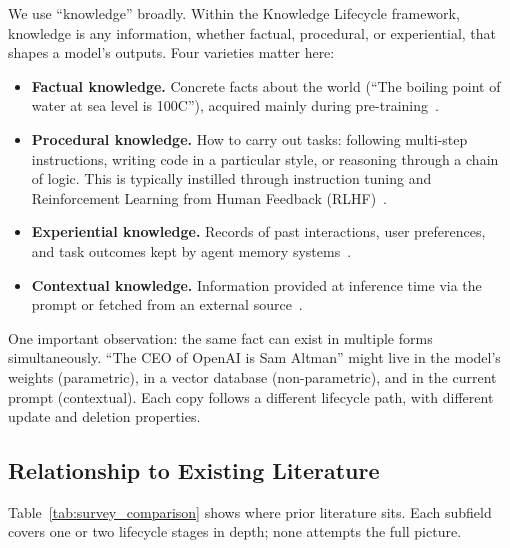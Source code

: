 \documentclass{article}
\begin{document}
We use ``knowledge'' broadly. Within the Knowledge Lifecycle framework, knowledge is any information, whether factual, procedural, or experiential, that shapes a model's outputs. Four varieties matter here:

\begin{itemize}[leftmargin=*]
  \item \textbf{Factual knowledge.} Concrete facts about the world (``The boiling point of water at sea level is 100\textdegree C''), acquired mainly during pre-training~\citep{petroni2019lama}.
  \item \textbf{Procedural knowledge.} How to carry out tasks: following multi-step instructions, writing code in a particular style, or reasoning through a chain of logic. This is typically instilled through instruction tuning and Reinforcement Learning from Human Feedback (RLHF)~\citep{ouyang2022instructgpt, wei2022flan}.
  \item \textbf{Experiential knowledge.} Records of past interactions, user preferences, and task outcomes kept by agent memory systems~\citep{park2023generative, packer2023memgpt}.
  \item \textbf{Contextual knowledge.} Information provided at inference time via the prompt or fetched from an external source~\citep{lewis2020rag}.
\end{itemize}

One important observation: the same fact can exist in multiple forms simultaneously. ``The CEO of OpenAI is Sam Altman'' might live in the model's weights (parametric), in a vector database (non-parametric), and in the current prompt (contextual). Each copy follows a different lifecycle path, with different update and deletion properties.

\subsection{Relationship to Existing Literature}

Table~\ref{tab:survey_comparison} shows where prior literature sits. Each subfield covers one or two lifecycle stages in depth; none attempts the full picture.
\end{document}
